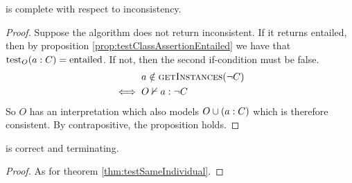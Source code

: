 \documentclass[paper.tex]{subfiles}
\begin{document}
\begin{proposition}
   is complete with respect to inconsistency.
\end{proposition}
\begin{proof}
  Suppose the algorithm does not return inconsistent.  If it returns entailed, then by proposition \ref{prop:testClassAssertionEntailed} we have that $\operatorname{test}_O(a : C) = \mathrm{entailed}$.  If not, then the second if-condition must be false.
  \begin{align*}
    & a \notin \Call{getInstances}{\neg C} \\
    \iff{}& O \nsementails a : \neg C
  \end{align*}
  So $O$ has an interpretation which also models $O \cup (a : C)$ which is therefore consistent.  By contrapositive, the proposition holds.
\end{proof}

\begin{theorem}
   is correct and terminating.
\end{theorem}
\begin{proof}
  As for theorem \ref{thm:testSameIndividual}.
\end{proof}
\end{document}
